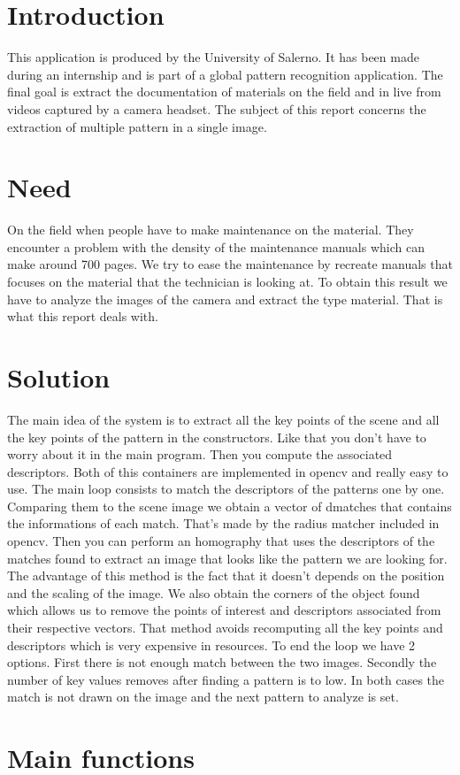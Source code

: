 \documentclass[english,a4paper,11pt]{report}
\begin{document}
\chapter{Introduction}
	This application is produced by the University of Salerno. It has been made during an internship and is part of a global pattern recognition application. The final goal is extract the documentation of materials on the field and in live from videos captured by a camera headset. The subject of this report concerns the extraction of multiple pattern in a single image.

\chapter{Need}
	On the field when people have to make maintenance on the material. They encounter a problem with the density of the maintenance manuals which can make around 700 pages. We try to ease the maintenance by recreate manuals that focuses on the material that the technician is looking at. To obtain this result we have to analyze the images of the camera and extract the type material. That is what this report deals with.


\chapter{Solution}
 The main idea of the system is to extract all the key points of the scene and all the key points of the pattern in the constructors. Like that you don't have to worry about it in the main program. 
Then you compute the associated descriptors. Both of this containers are implemented in opencv and really easy to use. 
The main loop consists to match the descriptors of the patterns one by one. Comparing them to the scene image we obtain a vector of dmatches that contains the informations of each match. That's made by the radius matcher included in opencv. 
Then you can perform an homography  that uses the descriptors of the matches found to extract an image that looks like the pattern we are looking for. The advantage of this method is the fact that it doesn't depends on the position and the scaling of the image. We also obtain the corners of the object found which allows us to remove the points of interest and descriptors associated from their respective vectors. That method avoids recomputing all the key points and descriptors which is very expensive in resources. 
To end the loop we have 2 options. First there is not enough match between the two images. Secondly the number of key values removes after finding a pattern is to low. In both cases the match is not drawn on the image and the next pattern to analyze is set.

\chapter{Main functions}
\section{}
\end{document}
